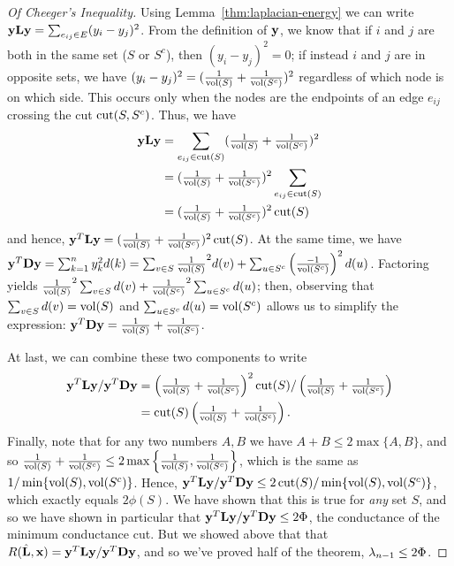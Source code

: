 \begin{proof}[Of Cheeger's Inequality]
Using Lemma~\ref{thm:laplacian-energy} we can write $\textbf{y}\textbf{L}\textbf{y} = \sum_{e_{ij} \in E} ( y_i - y_j )^2$.
From the definition of $\textbf{y}$, we know that if $i$ and $j$ are both in the same set ($S$ or $S^c$), then $( y_i - y_j )^2 = 0$; if instead $i$ and $j$ are in opposite sets, we have $( y_i - y_j )^2 = (\tfrac{1}{\operatorname{vol}(S)} + \tfrac{1}{\operatorname{vol}(S^c)})^2$ regardless of which node is on which side. This occurs only when the nodes are the endpoints of an edge $e_{ij}$ crossing the cut $\operatorname{cut}(S,S^c)$. Thus, we have
\begin{align}
  \textbf{y}\textbf{L}\textbf{y} &= \sum_{e_{ij} \in \operatorname{cut}(S) } (\tfrac{1}{\operatorname{vol}(S)} + \tfrac{1}{\operatorname{vol}(S^c)})^2  \\
  &= (\tfrac{1}{\operatorname{vol}(S)} + \tfrac{1}{\operatorname{vol}(S^c)})^2 \sum_{e_{ij} \in \operatorname{cut}(S)}   \\
  &= (\tfrac{1}{\operatorname{vol}(S)} + \tfrac{1}{\operatorname{vol}(S^c)})^2 \operatorname{cut}(S)
\end{align}
and hence, $\textbf{y}^T \textbf{L} \textbf{y} = (\tfrac{1}{\operatorname{vol}(S)} + \tfrac{1}{\operatorname{vol}(S^c)})^2 \operatorname{cut}(S)$. At the same time, we have $\textbf{y}^T\textbf{D}\textbf{y} = \sum_{k=1}^n y_k^2 d(k) = \sum_{v \in S} \tfrac{1}{\operatorname{vol}(S)}^2 d(v)  +  \sum_{u\in S^c} \left(\tfrac{-1}{\operatorname{vol}(S^c)}\right)^2 d(u)$.
Factoring yields  $\tfrac{1}{\operatorname{vol}(S)}^2 \sum_{v \in S}  d(v)  +  \tfrac{1}{\operatorname{vol}(S^c)}^2 \sum_{u\in S^c}  d(u)$; then, observing that $\sum_{v \in S}  d(v)  = \operatorname{vol}(S)$ and $\sum_{u \in S^c}  d(u) = \operatorname{vol}(S^c)$ allows us to simplify the expression: $\textbf{y}^T \textbf{D} \textbf{y} = \tfrac{1}{\operatorname{vol}(S)} + \tfrac{1}{\operatorname{vol}(S^c)}$.

At last, we can combine these two components to write
\begin{align}
  \textbf{y}^T\textbf{L}\textbf{y} / \textbf{y}^T\textbf{D}\textbf{y}  &=  \left(\tfrac{1}{\operatorname{vol}(S)} + \tfrac{1}{\operatorname{vol}(S^c)}\right)^2 \operatorname{cut}(S) / \left(\tfrac{1}{\operatorname{vol}(S)} + \tfrac{1}{\operatorname{vol}(S^c)} \right) \\
  &= \operatorname{cut}(S) \left(\tfrac{1}{\operatorname{vol}(S)} + \tfrac{1}{\operatorname{vol}(S^c)}\right).
\end{align}
Finally, note that for any two numbers $A,B$ we have $A+B \leq 2 \max\{A,B\}$, and so $\tfrac{1}{\operatorname{vol}(S)} + \tfrac{1}{\operatorname{vol}(S^c)} \leq 2 \max\left\{  \tfrac{1}{\operatorname{vol}(S)}, \tfrac{1}{\operatorname{vol}(S^c)}   \right\}$, which is the same as $1 / \min\{  \operatorname{vol}(S), \operatorname{vol}(S^c) \}$.
Hence, $\textbf{y}^T\textbf{L}\textbf{y} / \textbf{y}^T\textbf{D}\textbf{y} \leq 2 \operatorname{cut}(S) /  \min\{  \operatorname{vol}(S), \operatorname{vol}(S^c) \}$, which exactly equals $2\phi(S)$. We have shown that this is true for \emph{any} set $S$, and so we have shown in particular that $\textbf{y}^T \textbf{L} \textbf{y} / \textbf{y}^T \textbf{D} \textbf{y} \leq 2 \Phi$, the conductance of the minimum conductance cut.
But we showed above that that $R(\hat{\textbf{L}},\textbf{x}) = \textbf{y}^T\textbf{L}\textbf{y} / \textbf{y}^T\textbf{D}\textbf{y}$, and so we've proved half of the theorem, $\lambda_{n-1} \leq 2 \Phi$.

 \end{proof}

